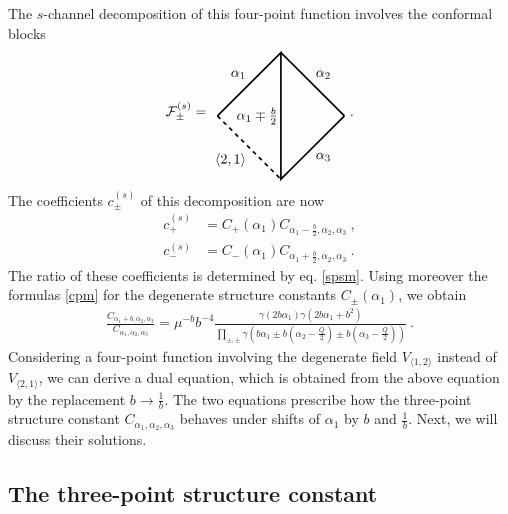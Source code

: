 \documentclass[12pt, a4paper, notitlepage, twoside]{report}
\numberwithin{equation}{section}
\theoremstyle{break}
\begin{document}
The $s$-channel decomposition of this four-point function involves the conformal blocks
 \begin{align}
\mathcal{F}^{(s)}_\pm = 
\begin{tikzpicture}[baseline=(current  bounding  box.center), very thick, scale = .8]
\draw (2, 0) -- node [above right] {\!$\alpha_2$} (0, 2);
\draw[dashed] (-2, 0)
-- node [below left] {$\langle 2,1 \rangle$\!} (0, -2); 
\draw (-2, 0) -- node [above left] {$\alpha_1$\!} (0, 2) 
-- node [left] {$\alpha_1\mp \frac{b}{2}\!  $} (0, -2)
-- node [below right] {\!$\alpha_3$} (2, 0);
\end{tikzpicture}
\ .
\end{align}
The coefficients $c^{(s)}_\pm$ of this decomposition are now 
\begin{align}
 c_+^{(s)} & = C_+(\alpha_1) C_{\alpha_1-\frac{b}{2},\alpha_2,\alpha_3} \ ,
\\
c_-^{(s)} & = C_-(\alpha_1) C_{\alpha_1+\frac{b}{2},\alpha_2,\alpha_3}\ .
\end{align}
The ratio of these coefficients is determined by eq. \eqref{spsm}. 
Using moreover the formulas \eqref{cpm} for the degenerate structure constants $C_\pm(\alpha_1)$, we obtain
\begin{align}
 \frac{C_{\alpha_1+b,\alpha_2,\alpha_3}}{C_{\alpha_1,\alpha_2,\alpha_3}} = \mu^{-b} b^{-4}\frac{\gamma(2b\alpha_1)\gamma(2b\alpha_1+b^2)}{\prod_{\pm,\pm} \gamma\left(b\alpha_1\pm b(\alpha_2-\frac{Q}{2})\pm b(\alpha_3-\frac{Q}{2})\right)}\ .
\label{fcc}
\end{align}
Considering a four-point function involving the degenerate field $V_{\langle 1,2 \rangle}$ instead of $V_{\langle 2,1 \rangle}$, we can derive a dual equation, which is obtained from the above equation by the replacement $b\to \frac{1}{b}$. 
The two equations prescribe how the three-point structure constant $C_{\alpha_1,\alpha_2,\alpha_3}$ behaves under shifts of $\alpha_1$ by $b$ and $\frac{1}{b}$.
Next, we will discuss their solutions.


\subsection{The three-point structure constant \label{sectpf}}
\end{document}
